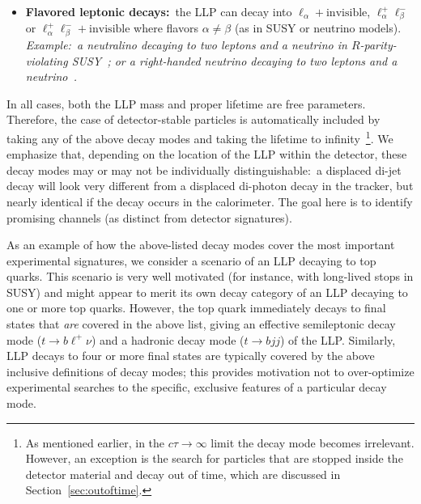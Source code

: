 \begin{itemize}
\item {\bf Flavored leptonic decays:}~the LLP can decay into $\ell_\alpha+\mathrm{invisible}$, $\ell_\alpha^+\ell_\beta^-$ or $\ell_\alpha^+\ell_\beta^-+\mathrm{invisible}$ where flavors $\alpha\neq\beta$ (as in SUSY or neutrino models).
\emph{Example:~a neutralino decaying to two leptons and a neutrino in $R$-parity-violating SUSY~\cite{Barbier:2004ez}; or a right-handed neutrino decaying to two leptons and a neutrino~\cite{delAguila:2008cj}.}
\end{itemize}

In all cases, both the LLP mass and proper lifetime are free parameters.
Therefore, the case of detector-stable particles is automatically included by taking any of the above decay modes and taking the lifetime to infinity~\footnote{As mentioned earlier, in the $c\tau\rightarrow\infty$ limit the decay mode becomes irrelevant. However, an exception is the search for particles that are stopped inside the detector material and decay out of time, which are discussed in Section~\ref{sec:outoftime}.}.
We emphasize that, depending on the location of the LLP within the detector, these decay modes may or may not be individually distinguishable:~a displaced di-jet decay will look very different from a displaced di-photon decay in the tracker, but nearly identical if the decay occurs in the calorimeter.
The goal here is to identify  promising channels (as distinct from detector signatures). 

As an example of how the above-listed decay modes cover the most important experimental signatures, we consider a scenario of an LLP decaying to top quarks.
This scenario is very well motivated (for instance, with long-lived stops in SUSY) and might appear to merit its own decay category of an LLP decaying to one or more top quarks.
However, the top quark immediately decays to final states that \emph{are} covered in the above list, giving an effective semileptonic decay mode ($t\rightarrow b\ell^+\nu$) and a hadronic decay mode ($t\rightarrow bjj$) of the LLP.
Similarly, LLP decays to four or more final states are typically covered by the above inclusive definitions of decay modes; this provides motivation not to over-optimize experimental searches to the specific, exclusive features of a particular decay mode.

